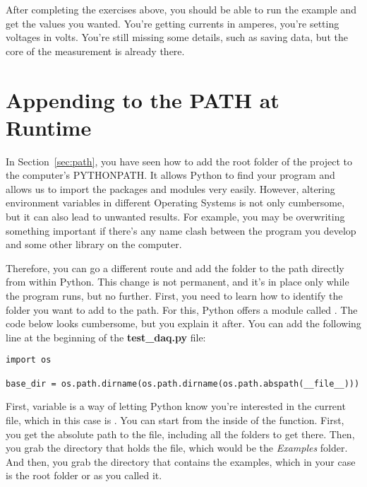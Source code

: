 
After completing the exercises above, you should be able to run the example and get the values you wanted. You're getting currents in amperes, you're setting voltages in volts. You're still missing some details, such as saving data, but the core of the measurement is already there.

\section{Appending to the PATH at Runtime}\label{sec:appending-path}
In Section~\ref{sec:path}, you have seen how to add the root folder of the project to the computer's PYTHONPATH. It allows Python to find your program and allows us to import the packages and modules very easily. However, altering environment variables in different Operating Systems is not only cumbersome, but it can also lead to unwanted results. For example, you may be overwriting something important if there's any name clash between the program you develop and some other library on the computer.

Therefore, you can go a different route and add the folder to the path directly from within Python. This change is not permanent, and it's in place only while the program runs, but no further. First, you need to learn how to identify the folder you want to add to the path. For this, Python offers a module called . The code below looks cumbersome, but you explain it after. You can add the following line at the beginning of the \textbf{test\_daq.py} file:

\begin{verbatim}
import os

base_dir = os.path.dirname(os.path.dirname(os.path.abspath(__file__)))
\end{verbatim}

First,  variable is a way of letting Python know you're interested in the current file, which in this case is . You can start from the inside of the function. First, you get the absolute path to the file, including all the folders to get there. Then, you grab the directory that holds the file, which would be the \emph{Examples} folder. And then, you grab the directory that contains the examples, which in your case is the root folder or  as you called it.


